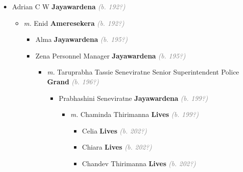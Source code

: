 \documentclass[10pt, openany]{book}
\begin{document}
\begin{itemize}
{\begin{itemize}
{\begin{itemize}
{\begin{itemize}
{\begin{itemize}
{\begin{itemize}
\item{UNKNOWN \textbf{Dissanayake} \textcolor{gray}{\textit{(b. 198?)}}
 }
\item{UNKNOWN \textbf{Dissanayake} \textcolor{gray}{\textit{(b. 198?)}}
 }
\end{itemize}}
\end{itemize}
 }
\end{itemize}}
\end{itemize}
 }
\item{Adrian C W \textbf{Jayawardena} \textcolor{gray}{\textit{(b. 192?)}}
\begin{itemize}
\item{\textit{m.} Enid \textbf{Ameresekera} \textcolor{gray}{\textit{(b. 192?)}}   \label{couple:00003286:00003287} \begin{itemize}
\item{Alma \textbf{Jayawardena} \textcolor{gray}{\textit{(b. 195?)}}
 }
\item{Zena Personnel Manager \textbf{Jayawardena} \textcolor{gray}{\textit{(b. 195?)}}
\begin{itemize}
\item{\textit{m.} Taruprabha Tassie Seneviratne Senior Superintendent Police \textbf{Grand} \textcolor{gray}{\textit{(b. 196?)}}   \label{couple:00003328:00003329} \begin{itemize}
\item{Prabhashini Seneviratne \textbf{Jayawardena} \textcolor{gray}{\textit{(b. 199?)}}
\begin{itemize}
\item{\textit{m.} Chaminda Thirimanna \textbf{Lives} \textcolor{gray}{\textit{(b. 199?)}}   \label{couple:00003330:00003331} \begin{itemize}
\item{Celia \textbf{Lives} \textcolor{gray}{\textit{(b. 202?)}}
 }
\item{Chiara \textbf{Lives} \textcolor{gray}{\textit{(b. 202?)}}
 }
\item{Chandev Thirimanna \textbf{Lives} \textcolor{gray}{\textit{(b. 202?)}}
  }
\end{itemize}}
\end{itemize}
  }
\end{itemize}}

\end{itemize}}
\end{itemize}}
\end{itemize}}
\end{itemize}}
\end{itemize}
\end{document}
